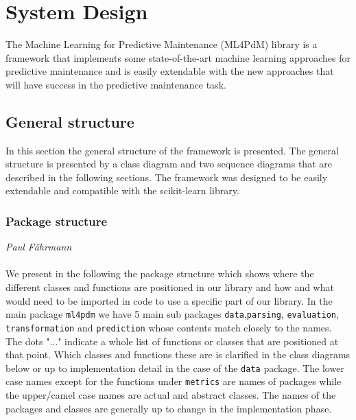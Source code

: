 %
\chapter{System Design}
\label{sec:system_design}

The Machine Learning for Predictive Maintenance (ML4PdM) library is a framework that implements some state-of-the-art machine learning approaches for predictive maintenance and is easily extendable with the new
approaches that will have success in the predictive maintenance task.

\section{General structure}

In this section the general structure of the framework is presented. The general structure is presented by a class diagram and two sequence diagrams that
are described in the following sections. The framework was designed to be easily extendable
and compatible with the scikit-learn library.

\subsection*{Package structure}
\vspace*{-10mm}\hfill{\normalsize\emph{Paul Fährmann}}
\\\\
We present in the following the package structure which shows where the different classes and functions are positioned in our library and how and what would need to be imported in code to use a specific part of our library. In the main package \verb|ml4pdm| we have 5 main sub packages \verb|data|,\verb|parsing|, \verb|evaluation|, \verb|transformation| and \verb|prediction| whose contents match closely to the names. The dots "$\dots$" indicate a whole list of functions or classes that are positioned at that point. Which classes and functions these are is clarified in the class diagrams below or up to implementation detail in the case of the \verb|data| package. The lower case names except for the functions under \verb|metrics| are names of packages while the upper/camel case names are actual and abstract classes. The names of the packages and classes are generally up to change in the implementation phase.
\\
\newpage
\setlength{\DTbaselineskip}{20pt}
\DTsetlength{1em}{3em}{0.1em}{1pt}{4pt}
